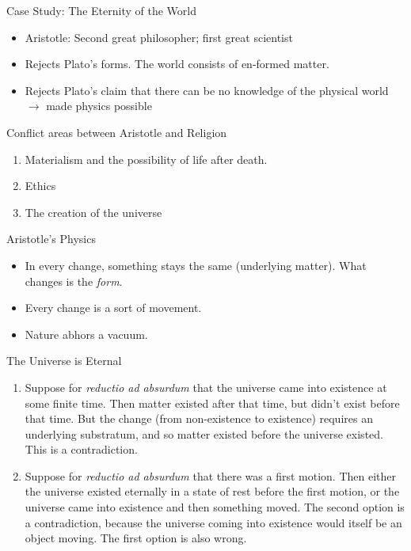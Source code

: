 \documentclass{beamer}
\begin{document}
\begin{frame}{Case Study: The Eternity of the World}

\begin{itemize}
\item Aristotle: Second great philosopher; first great scientist
\item Rejects Plato's forms.  The world consists of en-formed matter.
\item Rejects Plato's claim that there can be no knowledge of the
  physical world $\longrightarrow$ made physics possible
\end{itemize}
\end{frame}


\begin{frame}{Conflict areas between Aristotle and Religion}

\begin{enumerate}
\item Materialism and the possibility of life after death.
\item Ethics
\item The creation of the universe
\end{enumerate}

\end{frame}

\begin{frame}{Aristotle's Physics}

  \begin{itemize}
  \item In every change, something stays the same (underlying matter).
    What changes is the \emph{form}.
\item Every change is a sort of movement.
\item Nature abhors a vacuum.
\end{itemize}
\end{frame}

\begin{frame}{The Universe is Eternal}

\begin{enumerate} \item Suppose for \emph{reductio ad absurdum} that
  the universe came into existence at some finite time.  Then matter
  existed after that time, but didn't exist before that time.  But the
  change (from non-existence to existence) requires an underlying
  substratum, and so matter existed before the universe existed.  This
  is a contradiction.  
\item Suppose for \emph{reductio ad absurdum} that there was a first
  motion.  Then either the universe existed eternally in a state of
  rest before the first motion, or the universe came into existence
  and then something moved.  The second option is a contradiction,
  because the universe coming into existence would itself be an object
  moving.  The first option is also wrong.
\end{enumerate}
\end{frame}
\end{document}
